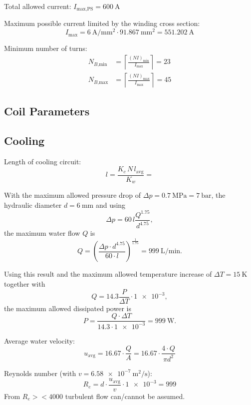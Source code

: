 \documentclass[10pt,a4paper,noendnumber=true]{scrartcl}
\begin{document}
Total allowed current: $I_\text{max,PS} = \SI{600}{\ampere}$

Maximum possible current limited by the winding cross section:
\begin{equation}
I_\text{max} = \SI{6}{\ampere\per\mm\squared} \cdot \SI{91.867}{\mm\squared} = \SI{551.202}{\ampere}
\end{equation}

Minimum number of turns:
\begin{align}
    N_{B\text{,min}} &= \left\lceil\frac{(NI)_\text{min}}{I_\text{max}}\right\rceil = 23\\
    N_{B\text{,max}} &= \left\lceil\frac{(NI)_\text{max}}{I_\text{max}}\right\rceil = 45
\end{align}

\subsection{Coil Parameters}

\subsection{Cooling}
Length of cooling circuit:
\begin{equation}
    l = \frac{K_c\,N\,l_\text{avg}}{K_w} = 
\end{equation}


With the maximum allowed pressure drop of $\Delta p = \SI{0.7}{\mega\pascal} = \SI{7}{\bar}$, the hydraulic diameter $d=\SI{6}{\mm}$ and using
\begin{equation}
\Delta p = 60\,l\frac{Q^{1.75}}{d^{4.75}},
\end{equation}
the maximum water flow $Q$ is
\begin{equation}
    Q = \left(\frac{\Delta p \cdot d^{4.75}}{60\cdot l}\right)^\frac{1}{1.75} = \SI{999}{\liter\per\minute}.
\end{equation}

Using this result and the maximum allowed temperature increase of $\Delta T=\SI{15}{\kelvin}$ together with
\begin{equation}
    Q = 14.3 \frac{P}{\Delta T} \cdot \num{1e-3},
\end{equation}
the maximum allowed dissipated power is
\begin{equation}
    P = \frac{Q \cdot \Delta T}{14.3 \cdot \num{1e-3}} = \SI{999}{\watt}.
\end{equation}

Average water velocity:
\begin{equation}
    u_\text{avg} = 16.67 \cdot \frac{Q}{A} = 16.67 \cdot \frac{4\cdot Q}{\pi d^2}
\end{equation}

Reynolds number (with $v=\SI{6.58e-7}{\meter\squared\per\second}$):
\begin{equation}
    R_e = d \cdot \frac{u_\text{avg}}{v} \cdot \num{1e-3} = \num{999}
\end{equation}
From $R_e><4000$ turbulent flow can/cannot be assumed.
\end{document}
